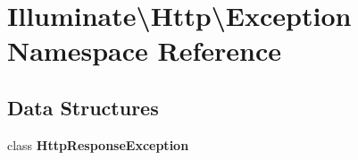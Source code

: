 \section{Illuminate\textbackslash{}Http\textbackslash{}Exception Namespace Reference}
\label{namespace_illuminate_1_1_http_1_1_exception}
\subsection*{Data Structures}
\begin{DoxyCompactItemize}
\item 
class {\bf Http\+Response\+Exception}
\end{DoxyCompactItemize}
